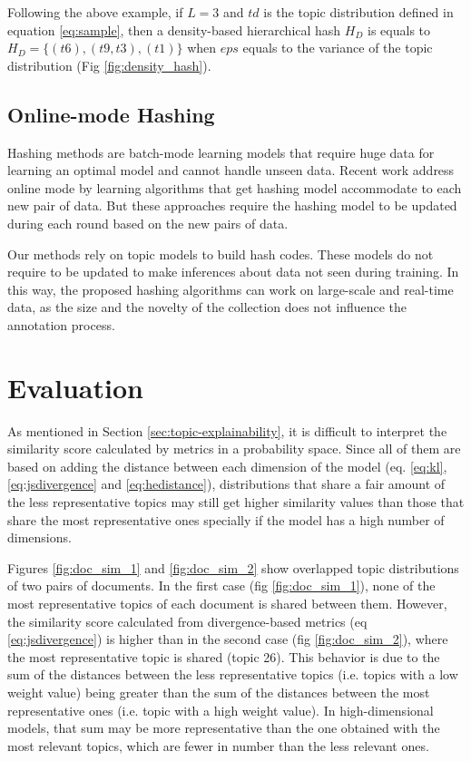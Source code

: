 Following the above example, if $L=3$ and $td$ is the topic distribution defined in equation \ref{eq:sample}, then a density-based hierarchical hash $H_{D}$ is equals to $H_{D}=\{(t6),(t9,t3),(t1)\}$ when $eps$ equals to the variance of the topic distribution (Fig \ref{fig:density_hash}).


\subsection{Online-mode Hashing}
\label{sec:comparison-onlineHashing}

Hashing methods are batch-mode learning models that require huge data for learning an optimal model and cannot handle unseen data. Recent work address online mode by learning algorithms \citep{Huang2018} that get hashing model accommodate to each new pair of data. But these approaches require the hashing model to be updated during each round based on the new pairs of data.

Our methods rely on topic models to build hash codes. These models do not require to be updated to make inferences about data not seen during training. In this way, the proposed hashing algorithms can work on large-scale and real-time data, as the size and the novelty of the collection does not influence the annotation process.

\section{Evaluation}
\label{sec:comparison-experiments}

As mentioned in Section \ref{sec:topic-explainability}, it is difficult to interpret the similarity score calculated by metrics in a probability space. Since all of them are based on adding the distance between each dimension of the model (eq. \ref{eq:kl}, \ref{eq:jsdivergence} and \ref{eq:hedistance}), distributions that share a fair amount of the less representative topics may still get higher similarity values than those that share the most representative ones specially if the model has a high number of dimensions.

Figures \ref{fig:doc_sim_1} and \ref{fig:doc_sim_2} show overlapped topic distributions of two pairs of documents. In the first case (fig  \ref{fig:doc_sim_1}), none of the most representative topics of each document is shared between them. However, the similarity score calculated from divergence-based metrics (eq \ref{eq:jsdivergence}) is higher than in the second case (fig  \ref{fig:doc_sim_2}), where the most representative topic is shared (topic 26). This behavior is due to the sum of the distances between the less representative topics (i.e. topics with a low weight value) being greater than the sum of the distances between the most representative ones (i.e. topic with a high weight value). In high-dimensional models, that sum may be more representative than the one obtained with the most relevant topics, which are fewer in number than the less relevant ones. 


